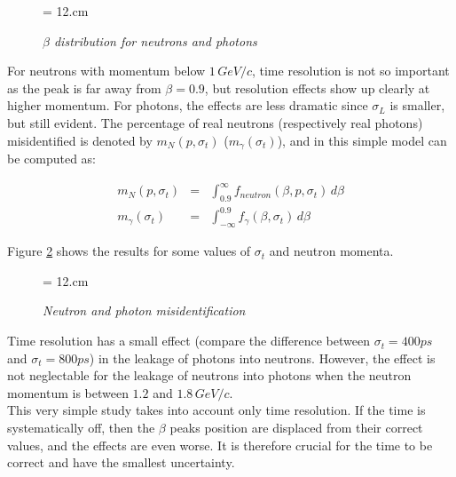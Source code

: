 \documentclass [12pt,letterpaper]{article}
\begin{document}
\begin{figure} [h]
\begin{center}
\epsfxsize = 12.cm
\caption{\it $\beta$ distribution for neutrons and photons}
\label{fig:betadistribution}
\end{center}
\end{figure}

For neutrons with momentum below $1\, GeV/c$, time resolution is not so important as the peak is far away from $\beta = 0.9$, but resolution effects show up clearly at higher momentum. For photons, the effects are less dramatic since $\sigma_{L}$ is smaller, but still evident. The percentage of real neutrons (respectively real photons) misidentified is denoted by $m_{N}(p,\sigma_{t})$ ($m_{\gamma}(\sigma_{t})$), and in this simple model can be computed as:

\begin{eqnarray}
 m_{N}(p,\sigma_{t}) & = & \int_{0.9}^{\infty} f_{neutron} (\beta, p, \sigma_t) \, d\beta\\
 m_{\gamma}(\sigma_{t}) & = &  \int_{- \infty}^{0.9} f_{\gamma} (\beta, \sigma_t) \, d\beta
\end{eqnarray}
 
Figure \ref{fig:neutrals_misidentified} shows the results for some values of $\sigma_{t}$ and neutron momenta.

\begin{figure} [h]
\begin{center}
\epsfxsize = 12.cm
\caption{\it Neutron and photon misidentification}
\label{fig:neutrals_misidentified}
\end{center}
\end{figure}

Time resolution has a small effect (compare the difference between $\sigma_{t} = 400 ps$ and $\sigma_{t} = 800 ps$) in the leakage of photons into neutrons. However, the effect is not neglectable for the leakage of neutrons into photons when the neutron momentum is between $1.2$ and $1.8 \, GeV/c$.\\
This very simple study takes into account only time resolution. If the time is systematically off, then the $\beta$ peaks position are displaced from their correct values, and the effects are even worse. It is therefore crucial for the time to be correct and have the smallest uncertainty. 
\end{document}
